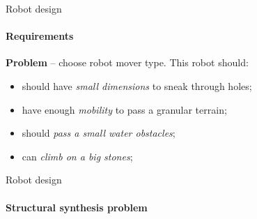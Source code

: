 \documentclass[aspectratio=169]{beamer}
\begin{document}
\begin{frame}[t]{Robot design}
    \framesubtitle{Requirements}
    \Large
    \textbf{Problem} --  choose robot mover type. This robot should:
    \begin{itemize}
        \item should have \textit{small dimensions} to sneak through holes;
        \item have enough \textit{mobility} to pass a granular terrain;
        \item should \textit{pass a small water obstacles};
        \item can \textit{climb on a big stones};
    \end{itemize}
\end{frame}

\begin{frame}[t]{Robot design}
    \framesubtitle{Structural synthesis problem}
\end{frame}
\end{document}
